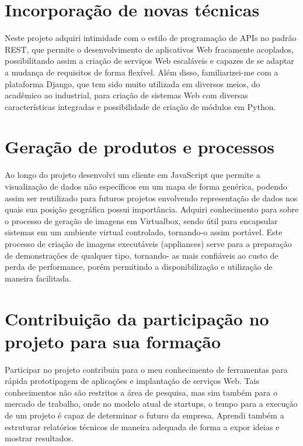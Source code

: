 \documentclass[%
        Portuguese,%
        ]
{ic-tese-v2}
\begin{document}
\section{Incorporação de novas técnicas}
Neste projeto adquiri intimidade com o estilo de programação de APIs no padrão REST, que permite o desenvolvimento de aplicativos Web fracamente acoplados, possibilitando assim a criação de serviços Web escaláveis e capazes de se adaptar a mudança de requisitos de forma flexível. Além disso, familiarizei-me com a plataforma Django, que tem sido muito utilizada em diversos meios, do acadêmico ao industrial, para criação de sistemas Web com diversas características integradas e possibilidade de criação de módulos em Python.
\section{Geração de produtos e processos}
Ao longo do projeto desenvolvi um cliente em JavaScript que permite a visualização de dados não específicos em um mapa de forma genérica, podendo assim ser reutilizado para futuros projetos envolvendo representação de dados nos quais sua posição geográfica possui importância.
Adquiri conhecimento para sobre o processo de geração de imagens em Virtualbox, sendo útil para encapsular sistemas em um ambiente virtual controlado, tornando-o assim portável. Este processo de criação de imagens executáveis (appliances) serve para a preparação de demonstrações de qualquer tipo, tornando- as mais confiáveis ao custo de perda de performance, porém permitindo a disponibilização e utilização de maneira facilitada.
\section{Contribuição da participação no projeto para sua formação}
Participar no projeto contribuiu para o meu conhecimento de ferramentas para rápida prototipagem de aplicações e implantação de serviços Web. Tais conhecimentos não são restritos a área de pesquisa, mas sim também para o mercado de trabalho, onde no modelo atual de startups, o tempo para a execução de um projeto é capaz de determinar o futuro da empresa. Aprendi também a estruturar relatórios técnicos de maneira adequada de forma a expor ideias e mostrar resultados.


% 
% 
\end{document}
